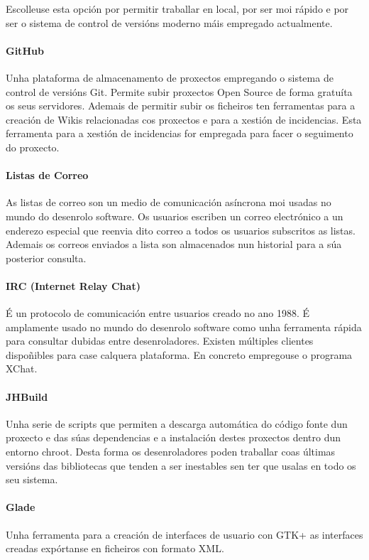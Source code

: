 Escolleuse esta opción por permitir traballar en local, por ser moi rápido e por ser o sistema de control de versións moderno máis empregado actualmente.

 \paragraph{GitHub} Unha plataforma de almacenamento de proxectos empregando o sistema de control de versións Git. Permite subir proxectos Open Source de forma gratuíta os seus servidores. Ademais de permitir subir os ficheiros ten ferramentas para a creación de Wikis relacionadas cos proxectos e para a xestión de incidencias. Esta ferramenta para a xestión de incidencias for empregada para facer o seguimento do proxecto.

 \paragraph{Listas de Correo} As listas de correo son un medio de comunicación asíncrona moi usadas no mundo do desenrolo software. Os usuarios escriben un correo electrónico a un enderezo especial que reenvia dito correo a todos os usuarios subscritos as listas. Ademais os correos enviados a lista son almacenados nun historial para a súa posterior consulta.


 \paragraph{IRC (Internet Relay Chat)} É un protocolo de comunicación entre usuarios creado no ano 1988. É amplamente usado no mundo do desenrolo software como unha ferramenta rápida para consultar dubidas entre desenroladores. Existen múltiples clientes dispoñibles para case calquera plataforma. En concreto empregouse o programa XChat.

 \paragraph{JHBuild} Unha serie de scripts que permiten a descarga automática do código fonte dun proxecto e das súas dependencias e a instalación destes proxectos dentro dun entorno chroot. Desta forma os desenroladores poden traballar coas últimas versións das bibliotecas que tenden a ser inestables sen ter que usalas en todo os seu sistema.

\paragraph{Glade} Unha ferramenta para a creación de interfaces de usuario con GTK+ as interfaces creadas expórtanse en ficheiros con formato XML.

